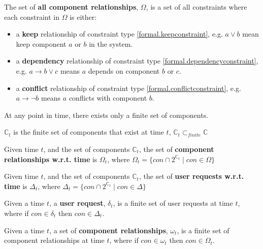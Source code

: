 \begin{defs}
The set of \textbf{all component relationships}, $\Omega$, is a set of all constraints where each constraint in $\Omega$ is either: 
\begin{itemize}
  \item a \textbf{keep} relationship of constraint type \ref{formal.keepconstraint}, e.g.  $a \vee b$ mean keep component $a$ or $b$ in the system.
  \item a \textbf{dependency} relationship of constraint type \ref{formal.dependencyconstraint}, e.g.  $a \rightarrow b \vee c$ means $a$ depends on component $b$ or $c$.
  \item a \textbf{conflict} relationship of constraint type \ref{formal.conflictconstraint},  e.g. $a \rightarrow \neg b$ means $a$ conflicts with component $b$.
\end{itemize}
\end{defs}

At any point in time, there exists only a finite set of components. 
\begin{defs}
$\mathbb{C}_t$ is the finite set of components that exist at time $t$, $\mathbb{C}_t \subset_{finite} \mathbb{C}$
\end{defs}

\begin{defs}
Given time $t$, and the set of components $\mathbb{C}_t$, the set of \textbf{component relationships w.r.t. time} is $\Omega_{t}$, where $\Omega_t = \{con \cap 2^{\mathbb{C}_t} \mid con \in \Omega\}$
\end{defs}

\begin{defs}
Given time $t$, and the set of components $\mathbb{C}_t$, the set of \textbf{user requests w.r.t. time} is $\Delta_{t}$, where $\Delta_t = \{con \cap 2^{\mathbb{C}_t} \mid con \in \Delta\}$
\end{defs}

\begin{defs}
Given a time $t$, a \textbf{user request}, $\delta_t$, is a finite set of user requests at time $t$, where if $con \in \delta_t$ then $con \in \Delta_t$.
\end{defs}

\begin{defs}
Given a time $t$, a set of \textbf{component relationships}, $\omega_t$, is a finite set of component relationships at time $t$, where if $con \in \omega_t$ then $con \in \Omega_t$.  
\end{defs}

